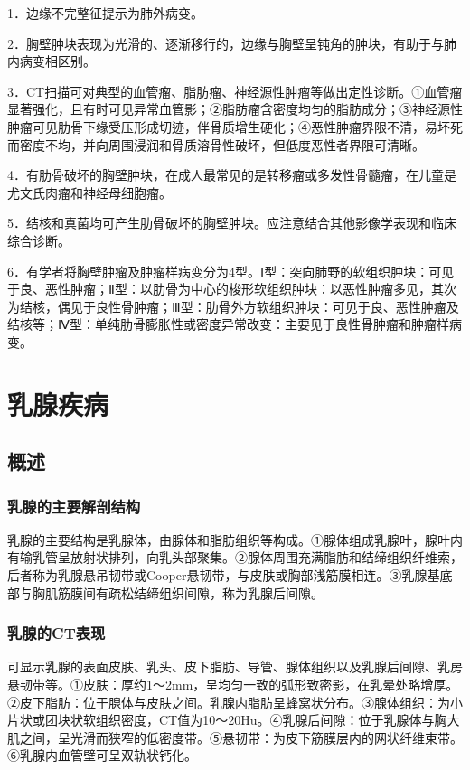 1．边缘不完整征提示为肺外病变。

2．胸壁肿块表现为光滑的、逐渐移行的，边缘与胸壁呈钝角的肿块，有助于与肺内病变相区别。

3．CT扫描可对典型的血管瘤、脂肪瘤、神经源性肿瘤等做出定性诊断。①血管瘤显著强化，且有时可见异常血管影；②脂肪瘤含密度均匀的脂肪成分；③神经源性肿瘤可见肋骨下缘受压形成切迹，伴骨质增生硬化；④恶性肿瘤界限不清，易坏死而密度不均，并向周围浸润和骨质溶骨性破坏，但低度恶性者界限可清晰。

4．有肋骨破坏的胸壁肿块，在成人最常见的是转移瘤或多发性骨髓瘤，在儿童是尤文氏肉瘤和神经母细胞瘤。

5．结核和真菌均可产生肋骨破坏的胸壁肿块。应注意结合其他影像学表现和临床综合诊断。

6．有学者将胸壁肿瘤及肿瘤样病变分为4型。Ⅰ型：突向肺野的软组织肿块：可见于良、恶性肿瘤；Ⅱ型：以肋骨为中心的梭形软组织肿块：以恶性肿瘤多见，其次为结核，偶见于良性骨肿瘤；Ⅲ型：肋骨外方软组织肿块：可见于良、恶性肿瘤及结核等；Ⅳ型：单纯肋骨膨胀性或密度异常改变：主要见于良性骨肿瘤和肿瘤样病变。

\section{乳腺疾病}

\subsection{概述}

\subsubsection{乳腺的主要解剖结构}

乳腺的主要结构是乳腺体，由腺体和脂肪组织等构成。①腺体组成乳腺叶，腺叶内有输乳管呈放射状排列，向乳头部聚集。②腺体周围充满脂肪和结缔组织纤维索，后者称为乳腺悬吊韧带或Cooper悬韧带，与皮肤或胸部浅筋膜相连。③乳腺基底部与胸肌筋膜间有疏松结缔组织间隙，称为乳腺后间隙。

\subsubsection{乳腺的CT表现}

可显示乳腺的表面皮肤、乳头、皮下脂肪、导管、腺体组织以及乳腺后间隙、乳房悬韧带等。①皮肤：厚约1～2mm，呈均匀一致的弧形致密影，在乳晕处略增厚。②皮下脂肪：位于腺体与皮肤之间。乳腺内脂肪呈蜂窝状分布。③腺体组织：为小片状或团块状软组织密度，CT值为10～20Hu。④乳腺后间隙：位于乳腺体与胸大肌之间，呈光滑而狭窄的低密度带。⑤悬韧带：为皮下筋膜层内的网状纤维束带。⑥乳腺内血管壁可呈双轨状钙化。

